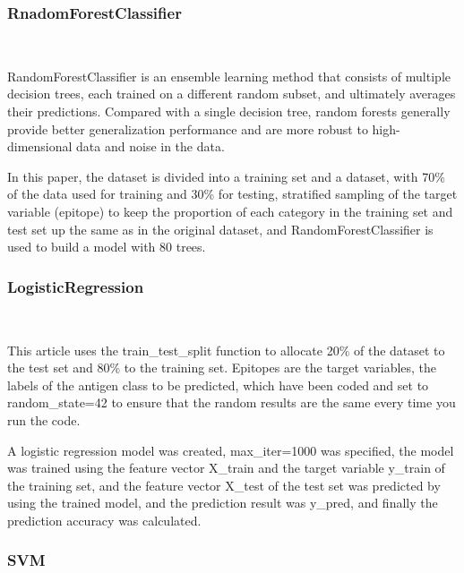 \documentclass[conference]{IEEEtran}
\begin{document}
	
	
	\subsubsection{RnadomForestClassifier} \
	
	RandomForestClassifier is an ensemble learning method that consists of multiple decision trees, each trained on a different random subset, and ultimately averages their predictions. Compared with a single decision tree, random forests generally provide better generalization performance and are more robust to high-dimensional data and noise in the data.
	
	In this paper, the dataset is divided into a training set and a dataset, with 70\% of the data used for training and 30\% for testing, stratified sampling of the target variable (epitope) to keep the proportion of each category in the training set and test set up the same as in the original dataset, and RandomForestClassifier is used to build a model with 80 trees.
	
	\subsubsection{LogisticRegression} \
	
	This article uses the train\_test\_split function to allocate 20\% of the dataset to the test set and 80\% to the training set. Epitopes are the target variables, the labels of the antigen class to be predicted, which have been coded and set to random\_state=42 to ensure that the random results are the same every time you run the code.
	
	A logistic regression model was created, max\_iter=1000 was specified, the model was trained using the feature vector X\_train and the target variable y\_train of the training set, and the feature vector X\_test of the test set was predicted by using the trained model, and the prediction result was y\_pred, and finally the prediction accuracy was calculated.
	
	\subsubsection{SVM} \
	
\end{document}
